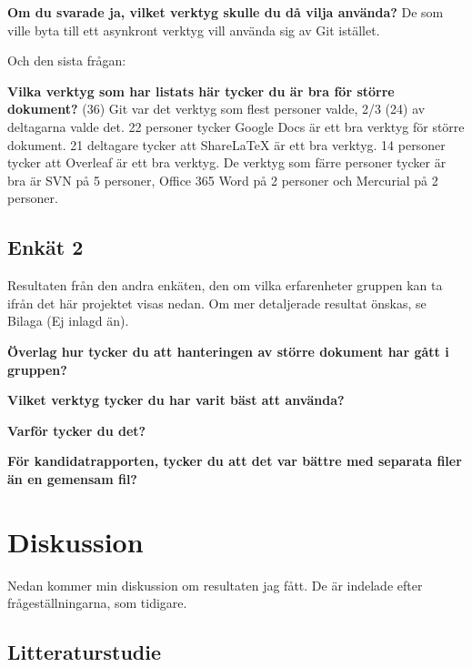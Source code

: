 \textbf{Om du svarade ja, vilket verktyg skulle du då vilja använda?}
De som ville byta till ett asynkront verktyg vill använda sig av Git istället.

Och den sista frågan:

\textbf{Vilka verktyg som har listats här tycker du är bra för större dokument?} (36)
Git var det verktyg som flest personer valde, 2/3 (24) av deltagarna valde det. 22 personer tycker Google Docs är ett bra verktyg för större dokument. 21 deltagare tycker att ShareLaTeX är ett bra verktyg. 14 personer tycker att Overleaf är ett bra verktyg. De verktyg som färre personer tycker är bra är SVN på 5 personer, Office 365 Word på 2 personer och Mercurial på 2 personer.


\subsection{Enkät 2}
Resultaten från den andra enkäten, den om vilka erfarenheter gruppen kan ta ifrån det här projektet visas nedan. Om mer detaljerade resultat önskas, se Bilaga (Ej inlagd än).

\textbf{Överlag hur tycker du att hanteringen av större dokument har gått i gruppen?}

\textbf{Vilket verktyg tycker du har varit bäst att använda?}

\textbf{Varför tycker du det?}

\textbf{För kandidatrapporten, tycker du att det var bättre med separata filer än en gemensam fil?}

\section{Diskussion}
\label{sec:discussion-tuhkala}
Nedan kommer min diskussion om resultaten jag fått. De är indelade efter frågeställningarna, som tidigare.

\subsection{Litteraturstudie}

